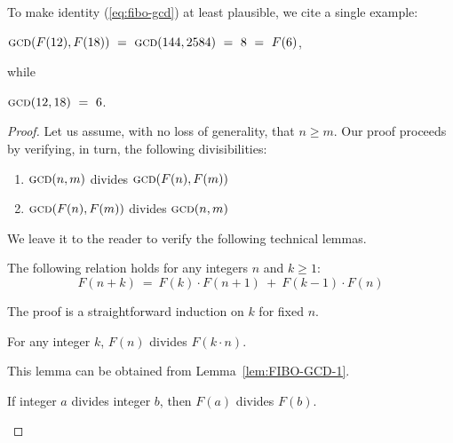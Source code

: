 \medskip

\noindent
To make identity (\ref{eq:fibo-gcd}) at least plausible, we cite a single example:

\hspace*{.35in}
$\mbox{\sc gcd}(F(12), F(18)) 
   \ = \ \mbox{\sc gcd}(144,2584)
   \ = \ 8 \ = \ F(6)$,

\noindent while

\hspace*{.35in}
$\mbox{\sc gcd}(12,18) \ = \ 6$.

\medskip

\begin{proof}
Let us assume, with no loss of generality,  that $n \geq m$.  Our proof proceeds by verifying, in turn, the following divisibilities:
\begin{enumerate}
\item
$\mbox{\sc gcd}(n,m)$ divides $\mbox{\sc gcd}(F(n), F(m))$

\item
$\mbox{\sc gcd}(F(n), F(m))$ divides $\mbox{\sc gcd}(n,m)$
\end{enumerate}

\smallskip

\noindent
We leave it to the reader to verify the following technical lemmas.


\begin{lemma}
\label{lem:FIBO-GCD-1}
The following relation holds for any integers $n$ and $k \geq 1$:
\[  F(n+k) \ = \ F(k) \cdot F(n+1) \ + \ F(k-1) \cdot F(n) \] 
\end{lemma}

\noindent
The proof is a straightforward induction on $k$ for fixed $n$.


\begin{lemma}
\label{lem:FIBO-GCD-2}
For any integer $k$, $F(n)$ divides $F(k \cdot n)$.
\end{lemma}

\noindent
This lemma can be obtained from Lemma~\ref{lem:FIBO-GCD-1}.

\begin{lemma}
\label{lem:FIBO-GCD-3}
If integer $a$ divides integer $b$, then $F(a)$ divides $F(b)$.
\end{lemma}


\end{proof}

